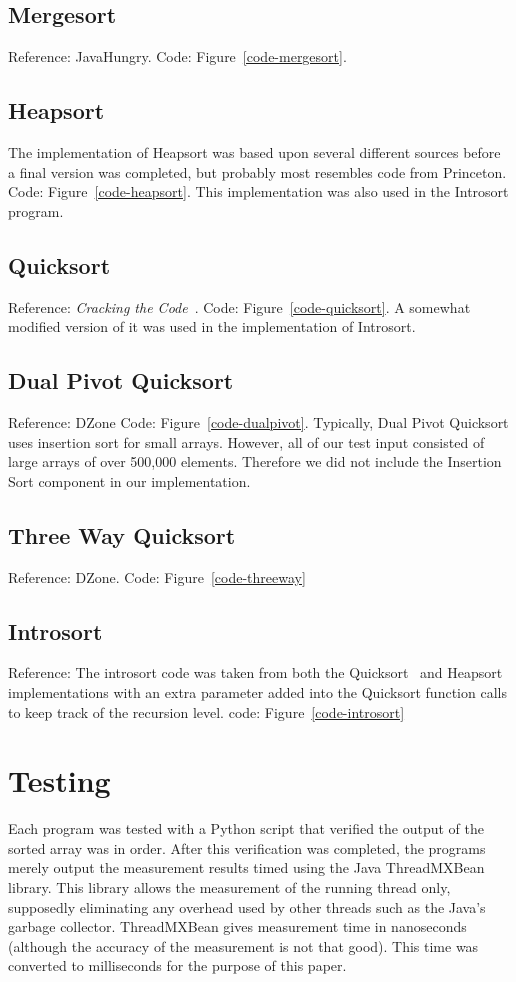 \documentclass{article}
\begin{document}
\subsection{Mergesort}
Reference: JavaHungry\cite{JavaHungry}.
Code: Figure~\ref{code-mergesort}.

\subsection{Heapsort}
The implementation of Heapsort was based upon several different sources before a final
version was completed, but probably most resembles code from Princeton\cite{Princeton}.
Code: Figure~\ref{code-heapsort}. 
This implementation was also used in the Introsort program.

\subsection{Quicksort}
Reference: \textit{Cracking the Code}~\cite{McDowell}. 
Code: Figure~\ref{code-quicksort}. 
A somewhat modified version of it was used in the implementation of Introsort.

\subsection{Dual Pivot Quicksort}
Reference: DZone\cite{DZone}
Code: Figure~\ref{code-dualpivot}. 
Typically, Dual Pivot Quicksort uses insertion sort for small
arrays. However, all of our test input consisted of large arrays of over 500,000 elements.
Therefore we did not include the Insertion Sort component in our implementation.

\subsection{Three Way Quicksort}
Reference: DZone\cite{DZone}. 
Code: Figure~\ref{code-threeway}

\subsection{Introsort}
Reference: The introsort code was taken from both the Quicksort~\cite{McDowell}
and Heapsort~\cite{Princeton} implementations with an extra parameter added
into the Quicksort function calls to keep track of the recursion level.
code: Figure~\ref{code-introsort}

\section{Testing}
Each program was tested with a Python script that verified the output of the sorted array
was in order. After this verification was completed, the programs merely output the
measurement results timed using the Java ThreadMXBean library. This library allows
the measurement of the running thread only, supposedly eliminating any overhead
used by other threads such as the Java's garbage collector. ThreadMXBean gives
measurement time in nanoseconds (although the accuracy of the measurement is 
not that good). This time was converted to milliseconds for the purpose of this paper.
\end{document}
